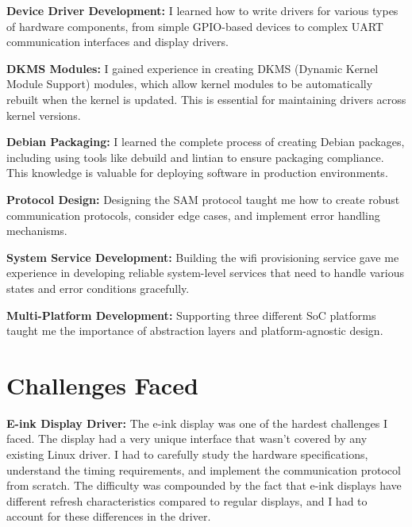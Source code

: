 \documentclass[12pt,a4paper]{report}
\begin{document}
\vspace{0.3cm}

\textbf{Device Driver Development:} I learned how to write drivers for various types of hardware components, from simple GPIO-based devices to complex UART communication interfaces and display drivers.

\vspace{0.3cm}

\textbf{DKMS Modules:} I gained experience in creating DKMS (Dynamic Kernel Module Support) modules, which allow kernel modules to be automatically rebuilt when the kernel is updated. This is essential for maintaining drivers across kernel versions.

\vspace{0.3cm}

\textbf{Debian Packaging:} I learned the complete process of creating Debian packages, including using tools like debuild and lintian to ensure packaging compliance. This knowledge is valuable for deploying software in production environments.

\vspace{0.3cm}

\textbf{Protocol Design:} Designing the SAM protocol taught me how to create robust communication protocols, consider edge cases, and implement error handling mechanisms.

\vspace{0.3cm}

\textbf{System Service Development:} Building the wifi provisioning service gave me experience in developing reliable system-level services that need to handle various states and error conditions gracefully.

\vspace{0.3cm}

\textbf{Multi-Platform Development:} Supporting three different SoC platforms taught me the importance of abstraction layers and platform-agnostic design.

\section{Challenges Faced}

\textbf{E-ink Display Driver:} The e-ink display was one of the hardest challenges I faced. The display had a very unique interface that wasn't covered by any existing Linux driver. I had to carefully study the hardware specifications, understand the timing requirements, and implement the communication protocol from scratch. The difficulty was compounded by the fact that e-ink displays have different refresh characteristics compared to regular displays, and I had to account for these differences in the driver.
\end{document}
